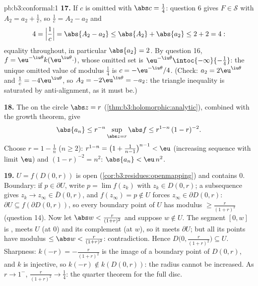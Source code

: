 \begin{solution}{pb:b3:conformal:1}
\textbf{17.} If $c$ is omitted with $\abs c = \frac14$:
question 6 gives $F \in \mathcal S$ with $A_2 = a_2 +
\frac1c$, so $\frac1c = A_2 - a_2$ and
\[
4 = \Bigl|\frac1c\Bigr| = \abs{A_2 - a_2}
\leq \abs{A_2} + \abs{a_2} \leq 2 + 2 = 4 :
\]
equality throughout, in particular $\abs{a_2} = 2$. By
question 16, $f = \eu^{-\iu\theta}k(\eu^{\iu\theta}\cdot)$,
whose omitted set is $\eu^{-\iu\theta}
\intoc{-\infty}{-\frac14}$: the unique omitted value of
modulus $\frac14$ is $c = -\eu^{-\iu\theta}/4$. (Check:
$a_2 = 2\eu^{\iu\theta}$ and $\frac1c = -4\eu^{\iu\theta}$,
so $A_2 = -2\eu^{\iu\theta} = -a_2$: the triangle
inequality is saturated by anti-alignment, as it must be.)

\textbf{18.} The  on the circle $\abs z =
r$ (\cref{thm:b3:holomorphic:analytic}), combined with the
growth theorem, give
\[
\abs{a_n} \leq r^{-n}\sup_{\abs z = r}\abs f
\leq r^{1-n}\,(1 - r)^{-2} .
\] Choose $r = 1 - \frac1n$ ($n \geq
2$): $r^{1-n} = \bigl(1 + \frac1{n-1}\bigr)^{n-1} < \eu$
(increasing sequence with limit $\eu$) and $(1 - r)^{-2} =
n^2$: $\abs{a_n} < \eu\,n^2$.

\textbf{19.} $U = f(D(0, r))$ is open
(\cref{cor:b3:residues:openmapping}) and contains $0$.
Boundary: if $p \in \partial U$, write $p = \lim f(z_k)$
with $z_k \in D(0, r)$; a subsequence gives $z_k \to z_\infty
\in \bar D(0, r)$, and $f(z_\infty) = p \notin U$ forces
$z_\infty \in \partial D(0, r)$: $\partial U \subseteq
f(\partial D(0, r))$, so every boundary point of $U$ has
modulus $\geq \frac r{(1+r)^2}$ (question 14). Now let
$\abs w < \frac r{(1+r)^2}$ and suppose $w \notin U$. The
segment $[0, w]$ is , meets $U$ (at $0$) and its
complement (at $w$), so it meets $\partial U$; but all its
points have modulus $\leq \abs w < \frac r{(1+r)^2}$:
contradiction. Hence $D\bigl(0, \frac r{(1+r)^2}\bigr)
\subseteq U$. Sharpness: $k(-r) = -\frac r{(1+r)^2}$ is the
image of a boundary point of $D(0,r)$, and $k$ is injective,
so $k(-r) \notin k(D(0, r))$: the radius cannot be
increased. As $r \to 1^-$, $\frac r{(1+r)^2} \to \frac14$:
the quarter theorem for the full disc.


\end{solution}
